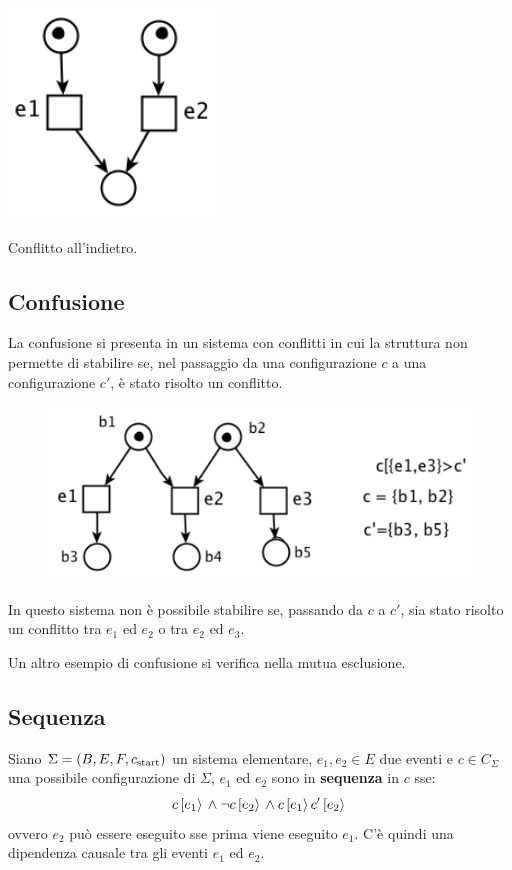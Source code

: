 \begin{defn}
    \begin{marginfigure}[-3cm]
        \includegraphics[width=0.75\linewidth]{img/conflitto_indietro.png}
        \caption{Conflitto all'indietro.}
        \label{fig:conflitto_indietro}
    \end{marginfigure}
\end{defn}

\subsection*{Confusione}
La confusione si presenta in un sistema con conflitti in cui la struttura non
permette di stabilire se, nel passaggio da una configurazione $c$ a una
configurazione $c'$, è stato risolto un conflitto.

\begin{figure}
    \centering
    \includegraphics[width=0.5\linewidth]{img/confusione.png}
    \label{fig:confusione}
\end{figure}
In questo sistema non è possibile stabilire se, passando da $c$ a $c'$, sia
stato risolto un conflitto tra $e_1$ ed $e_2$ o tra $e_2$ ed $e_3$.

Un altro esempio di confusione si verifica nella mutua esclusione.

\subsection*{Sequenza}
Siano $\Sigma = (B, E, F, c_{\textnormal{start}})$ un sistema elementare,
$e_1, e_2 \in E$ due eventi e $c \in C_{\Sigma}$ una possibile configurazione
di $\Sigma$, $e_1$ ed $e_2$ sono in \textbf{sequenza} in $c$ sse:
\[
    c\,[e_1\rangle\, \land \lnot c\,[e_2\rangle\, \land
    c\,[e_1\rangle\,c'\,[e_2\rangle\,\]
ovvero $e_2$ può essere eseguito sse prima viene eseguito $e_1$.
C'è quindi una dipendenza causale tra gli eventi $e_1$ ed $e_2$.

